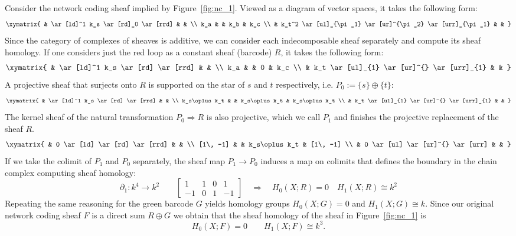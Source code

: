 \begin{ex}
Consider the network coding sheaf implied by Figure~\ref{fig:nc_1}. Viewed as a diagram of vector spaces, it takes the following form:
\[
\xymatrix{ & \ar[ld]^1 k_s \ar[rd]_0 \ar[rrd] & & \\
		k_a & & k_b & k_c \\
		& k_t^2 \ar[ul]_{\pi_1} \ar[ur]^{\pi_2} \ar[urr]_{\pi_1} & & }
\]
Since the category of complexes of sheaves is additive, we can consider each indecomposable sheaf separately and compute its sheaf homology. If one considers just the red loop as a constant sheaf (barcode) $R$, it takes the following form:
\[
\xymatrix{ & \ar[ld]^1 k_s \ar[rd] \ar[rrd] & & \\
	k_a & & 0 & k_c \\
        & k_t \ar[ul]_{1} \ar[ur]^{} \ar[urr]_{1} & & }
\]
A projective sheaf that surjects onto $R$ is supported on the star of $s$ and $t$ respectively, i.e. $P_0:=\{s\}\oplus\{t\}$:
\[
\xymatrix{ & \ar[ld]^1 k_s \ar[rd] \ar[rrd] & & \\
	k_s\oplus k_t & & k_s\oplus k_t & k_s\oplus k_t \\
        & k_t \ar[ul]_{1} \ar[ur]^{} \ar[urr]_{1} & & }
\]
The kernel sheaf of the natural transformation $P_0\Rightarrow R$ is also projective, which we call $P_1$ and finishes the projective replacement of the sheaf $R$.
\[
\xymatrix{ & 0 \ar[ld] \ar[rd] \ar[rrd] & & \\
	[1\, -1] & & k_s\oplus k_t & [1\, -1] \\
        & 0 \ar[ul] \ar[ur]^{} \ar[urr] & & }
\]
If we take the colimit of $P_1$ and $P_0$ separately, the sheaf map $P_1\to P_0$ induces a map on colimits that defines the boundary in the chain complex computing sheaf homology:
\[
\partial_1: k^4\to k^2 \qquad 
\begin{bmatrix} 1 & 1 & 0 & 1 \\
-1 & 0 & 1 & -1\end{bmatrix}
\quad \Rightarrow \quad H_0(X;R)=0 \quad H_1(X;R)\cong k^2
\]
 Repeating the same reasoning for the green barcode $G$ yields homology groups $H_0(X;G)=0$ and $H_1(X;G)\cong k$. Since our original network coding sheaf $F$ is a direct sum $R\oplus G$ we obtain that the sheaf homology of the sheaf in Figure~\ref{fig:nc_1} is
\[
H_0(X;F)=0 \qquad H_1(X;F)\cong k^3.
\]
\end{ex}

